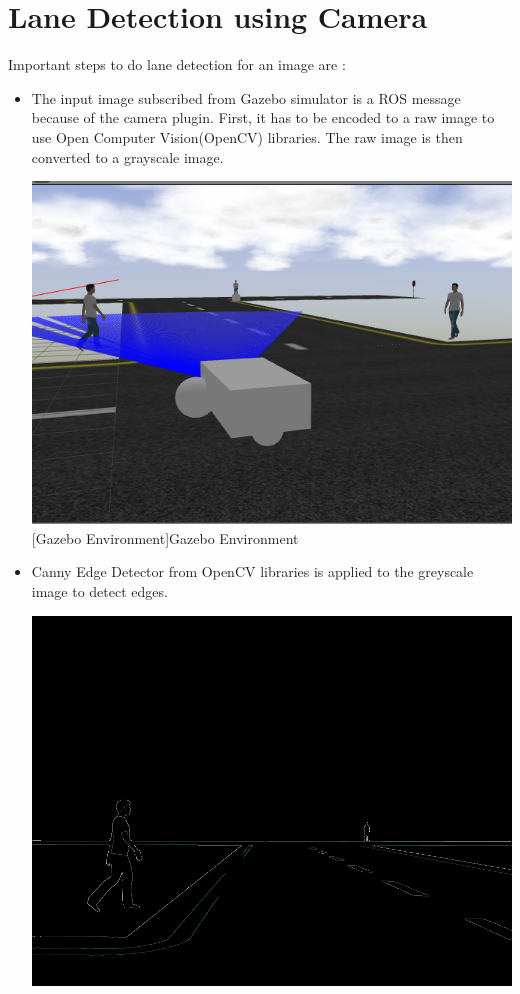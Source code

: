 \documentclass[%
xelatex,
	oneside,		%
	12pt,			%
	parskip=half,	%
	abstracton,
	chapterprefix=true%
    appendixprefix=true]
{scrbook}
\begin{document}
		\section{Lane Detection using Camera}
	\vspace*{0.5cm}
	Important steps to do lane detection for an image are : 
	\begin{itemize}
\item	The input image subscribed from Gazebo simulator is a ROS message because of the camera plugin. First, it has to be encoded to a raw image to use Open Computer Vision(OpenCV) libraries. The raw image is then converted to a grayscale image.
\begin{center}
\includegraphics[scale=0.4]{fig/canny1.png}
[Gazebo Environment]{Gazebo Environment}
\label{fig:gazebo}
\end{center}
\item Canny Edge Detector from OpenCV libraries is applied to the greyscale image to detect edges.
	\begin{center}
\includegraphics[scale=0.3]{fig/canny.png}

\end{center}
\end{itemize}
\end{document}
